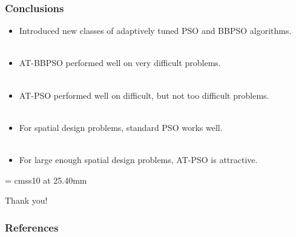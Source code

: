 \documentclass[xcolor=dvipsnames]{beamer}
\begin{document}
\begin{frame}
  \frametitle{Conclusions}
  \begin{itemize}
  \item Introduced new classes of adaptively tuned PSO and BBPSO algorithms.\\~\\ \pause
  \item AT-BBPSO performed well on very difficult problems. \\~\\ \pause
  \item AT-PSO performed well on difficult, but not too difficult problems. \\~\\ \pause
  \item For spatial design problems, standard PSO works well. \\~\\\pause
  \item For large enough spatial design problems, AT-PSO is attractive.
  \end{itemize}
\end{frame}

\appendix
{}
\setcounter{finalframe}{\value{framenumber}}

\begin{frame}

      \begin{center}

        \font\endfont = cmss10 at 25.40mm
        \color{MUgold}
        \endfont
        \baselineskip 20.0mm

        Thank you!

      \end{center}


\end{frame}

\begin{frame}[allowframebreaks]
        \frametitle{References}
        
        
\end{frame}
\setcounter{framenumber}{\value{finalframe}}
\end{document}
